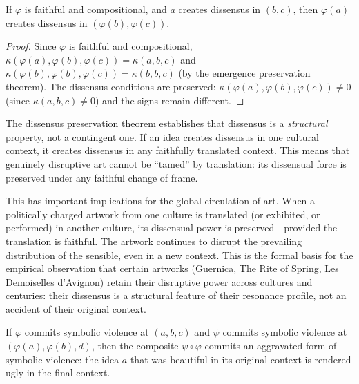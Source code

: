 \begin{theorem}
\label{thm:dissensus-faithful}
If $\varphi$ is faithful and compositional, and $a$ creates dissensus in $(b, c)$, then $\varphi(a)$ creates dissensus in $(\varphi(b), \varphi(c))$.
\end{theorem}

\begin{proof}
Since $\varphi$ is faithful and compositional, $\kappa(\varphi(a), \varphi(b), \varphi(c)) = \kappa(a, b, c)$ and $\kappa(\varphi(b), \varphi(b), \varphi(c)) = \kappa(b, b, c)$ (by the emergence preservation theorem).  The dissensus conditions are preserved: $\kappa(\varphi(a), \varphi(b), \varphi(c)) \neq 0$ (since $\kappa(a, b, c) \neq 0$) and the signs remain different.
\end{proof}

\begin{interpretation}
\label{interp:universality-dissensus}
The dissensus preservation theorem establishes that dissensus is a \emph{structural} property, not a contingent one.  If an idea creates dissensus in one cultural context, it creates dissensus in any faithfully translated context.  This means that genuinely disruptive art cannot be ``tamed'' by translation: its dissensual force is preserved under any faithful change of frame.

This has important implications for the global circulation of art.  When a politically charged artwork from one culture is translated (or exhibited, or performed) in another culture, its dissensual power is preserved---provided the translation is faithful.  The artwork continues to disrupt the prevailing distribution of the sensible, even in a new context.  This is the formal basis for the empirical observation that certain artworks (Guernica, The Rite of Spring, Les Demoiselles d'Avignon) retain their disruptive power across cultures and centuries: their dissensus is a structural feature of their resonance profile, not an accident of their original context.
\end{interpretation}

\begin{theorem}
\label{thm:symbolic-violence-compose}
If $\varphi$ commits symbolic violence at $(a, b, c)$ and $\psi$ commits symbolic violence at $(\varphi(a), \varphi(b), d)$, then the composite $\psi \circ \varphi$ commits an aggravated form of symbolic violence: the idea $a$ that was beautiful in its original context is rendered ugly in the final context.
\end{theorem}

